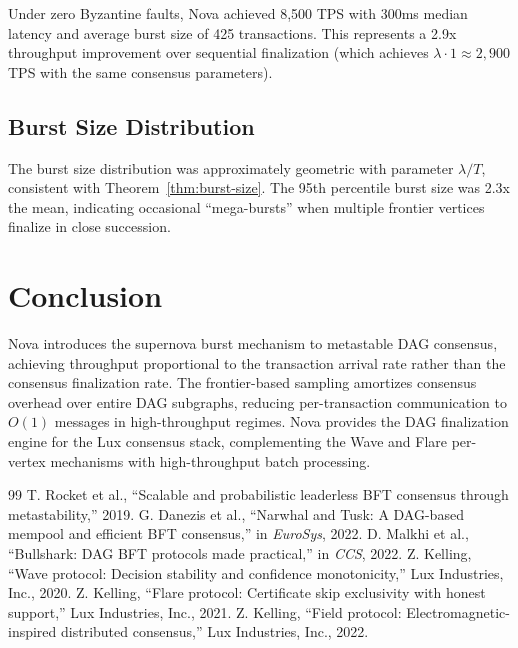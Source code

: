 \documentclass[11pt,a4paper]{article}
\begin{document}
Under zero Byzantine faults, Nova achieved 8,500 TPS with 300ms median latency and
average burst size of 425 transactions. This represents a 2.9x throughput improvement
over sequential finalization (which achieves $\lambda \cdot 1 \approx 2,900$ TPS with
the same consensus parameters).

\subsection{Burst Size Distribution}

The burst size distribution was approximately geometric with parameter $\lambda/T$,
consistent with Theorem~\ref{thm:burst-size}. The 95th percentile burst size was
2.3x the mean, indicating occasional ``mega-bursts'' when multiple frontier vertices
finalize in close succession.

\section{Conclusion}
\label{sec:conclusion}

Nova introduces the supernova burst mechanism to metastable DAG consensus, achieving
throughput proportional to the transaction arrival rate rather than the consensus
finalization rate. The frontier-based sampling amortizes consensus overhead over
entire DAG subgraphs, reducing per-transaction communication to $O(1)$ messages in
high-throughput regimes. Nova provides the DAG finalization engine for the Lux
consensus stack, complementing the Wave and Flare per-vertex mechanisms with
high-throughput batch processing.

\begin{thebibliography}{99}
 T. Rocket et al., ``Scalable and probabilistic leaderless BFT consensus through metastability,'' 2019.
 G. Danezis et al., ``Narwhal and Tusk: A DAG-based mempool and efficient BFT consensus,'' in \emph{EuroSys}, 2022.
 D. Malkhi et al., ``Bullshark: DAG BFT protocols made practical,'' in \emph{CCS}, 2022.
 Z. Kelling, ``Wave protocol: Decision stability and confidence monotonicity,'' Lux Industries, Inc., 2020.
 Z. Kelling, ``Flare protocol: Certificate skip exclusivity with honest support,'' Lux Industries, Inc., 2021.
 Z. Kelling, ``Field protocol: Electromagnetic-inspired distributed consensus,'' Lux Industries, Inc., 2022.
\end{thebibliography}
\end{document}
